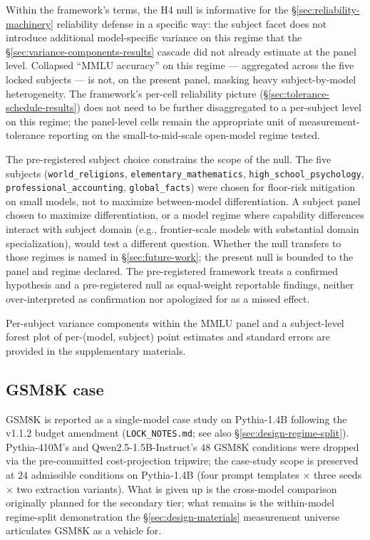 \documentclass[11pt]{article}
\begin{document}
Within the framework's terms, the H4 null is informative for the §\ref{sec:reliability-machinery} reliability defense in a specific way: the subject facet does not introduce additional model-specific variance on this regime that the §\ref{sec:variance-components-results} cascade did not already estimate at the panel level. Collapsed ``MMLU accuracy'' on this regime --- aggregated across the five locked subjects --- is not, on the present panel, masking heavy subject-by-model heterogeneity. The framework's per-cell reliability picture (§\ref{sec:tolerance-schedule-results}) does not need to be further disaggregated to a per-subject level on this regime; the panel-level cells remain the appropriate unit of measurement-tolerance reporting on the small-to-mid-scale open-model regime tested.

\begin{sloppypar}
The pre-registered subject choice constrains the scope of the null. The five subjects (\texttt{world\_religions}, \texttt{elementary\_mathematics}, \texttt{high\_school\_psychology}, \texttt{professional\_accounting}, \texttt{global\_facts}) were chosen for floor-risk mitigation on small models, not to maximize between-model differentiation. A subject panel chosen to maximize differentiation, or a model regime where capability differences interact with subject domain (e.g., frontier-scale models with substantial domain specialization), would test a different question. Whether the null transfers to those regimes is named in §\ref{sec:future-work}; the present null is bounded to the panel and regime declared. The pre-registered framework treats a confirmed hypothesis and a pre-registered null as equal-weight reportable findings, neither over-interpreted as confirmation nor apologized for as a missed effect.
\end{sloppypar}

Per-subject variance components within the MMLU panel and a subject-level forest plot of per-(model, subject) point estimates and standard errors are provided in the supplementary materials.

\subsection{GSM8K case}
\label{sec:gsm8k-results}

GSM8K is reported as a single-model case study on Pythia-1.4B following the v1.1.2 budget amendment (\texttt{LOCK\_NOTES.md}; see also §\ref{sec:design-regime-split}). Pythia-410M's and Qwen2.5-1.5B-Instruct's $48$ GSM8K conditions were dropped via the pre-committed cost-projection tripwire; the case-study scope is preserved at $24$ admissible conditions on Pythia-1.4B (four prompt templates $\times$ three seeds $\times$ two extraction variants). What is given up is the cross-model comparison originally planned for the secondary tier; what remains is the within-model regime-split demonstration the §\ref{sec:design-materials} measurement universe articulates GSM8K as a vehicle for.
\end{document}
